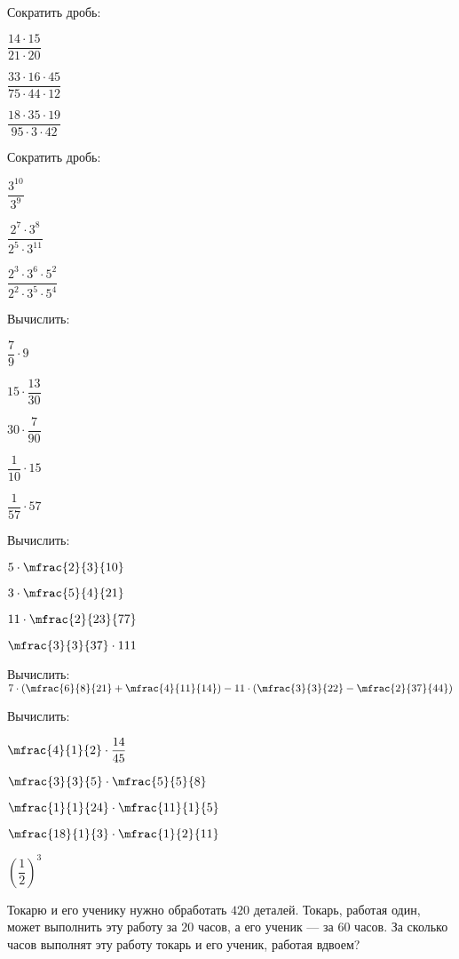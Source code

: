 \begin{listofex}
	\item Сократить дробь:
	\begin{enumcols}[itemcolumns=3]
		\item \( \dfrac{14\cdot15}{21\cdot20} \)
		\item \( \dfrac{33\cdot16\cdot45}{75\cdot44\cdot12} \)
		\item \( \dfrac{18\cdot35\cdot19}{95\cdot3\cdot42} \)
	\end{enumcols}
	\item Сократить дробь:
	\begin{enumcols}[itemcolumns=3]
		\item \( \dfrac{3^{10}}{3^9} \)
		\item \( \dfrac{2^7\cdot3^8}{2^5\cdot3^{11}} \)
		\item \( \dfrac{2^3\cdot3^6\cdot5^2}{2^2\cdot3^5\cdot5^4} \)
	\end{enumcols}
	\item Вычислить:
	\begin{enumcols}[itemcolumns=5]
		\item \( \dfrac{7}{9}\cdot9 \)
		\item \( 15\cdot\dfrac{13}{30} \)
		\item \( 30\cdot\dfrac{7}{90} \)
		\item \( \dfrac{1}{10}\cdot15 \)
		\item \( \dfrac{1}{57}\cdot57 \)
	\end{enumcols}
	\item Вычислить:
	\begin{enumcols}[itemcolumns=4]
		\item \( 5\cdot\mfrac{2}{3}{10} \)
		\item \( 3\cdot\mfrac{5}{4}{21} \)
		\item \( 11\cdot\mfrac{2}{23}{77} \)
		\item \( \mfrac{3}{3}{37}\cdot111 \)
	\end{enumcols}
	\item Вычислить: \( 7\cdot\left( \mfrac{6}{8}{21}+\mfrac{4}{11}{14} \right)-11\cdot\left( \mfrac{3}{3}{22}-\mfrac{2}{37}{44} \right) \)
	\item Вычислить:
	\begin{enumcols}[itemcolumns=5]
		\item \( \mfrac{4}{1}{2}\cdot\dfrac{14}{45} \)
		\item \( \mfrac{3}{3}{5}\cdot\mfrac{5}{5}{8} \)
		\item \( \mfrac{1}{1}{24}\cdot\mfrac{11}{1}{5} \)
		\item \( \mfrac{18}{1}{3}\cdot\mfrac{1}{2}{11} \)
		\item \( \left( \dfrac{1}{2} \right)^3 \)
	\end{enumcols}
	\item Токарю и его ученику нужно обработать \( 420 \) деталей. Токарь, работая один, может
	выполнить эту работу за \( 20 \) часов, а его ученик --- за \( 60 \) часов. За сколько часов выполнят эту работу токарь и его ученик, работая вдвоем?
\end{listofex}
